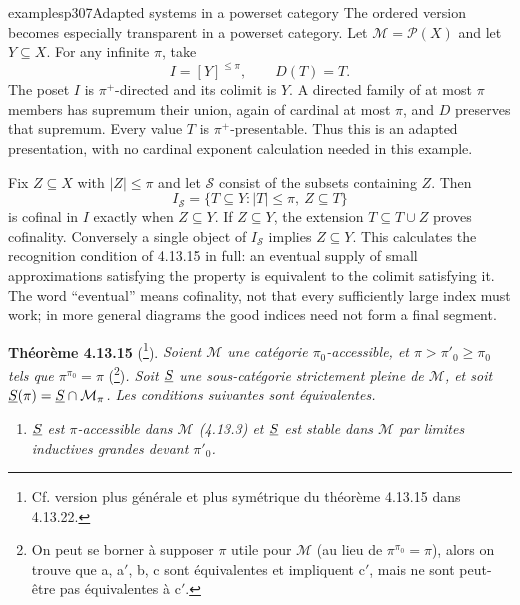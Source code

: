 \begin{dcomment}{examples}{p307}{Adapted systems in a powerset category}
The ordered version becomes especially transparent in a powerset category. Let $\mathcal M=\mathcal P(X)$ and let $Y\subseteq X$. For any infinite $\pi$, take
\[
 I=[Y]^{\leq\pi},\qquad D(T)=T.
\]
The poset $I$ is $\pi^+$-directed and its colimit is $Y$. A directed family of at most $\pi$ members has supremum their union, again of cardinal at most $\pi$, and $D$ preserves that supremum. Every value $T$ is $\pi^+$-presentable. Thus this is an adapted presentation, with no cardinal exponent calculation needed in this example.

Fix $Z\subseteq X$ with $|Z|\leq\pi$ and let $\mathcal S$ consist of the subsets containing $Z$. Then
\[
 I_{\mathcal S}=\{T\subseteq Y:|T|\leq\pi,\ Z\subseteq T\}
\]
is cofinal in $I$ exactly when $Z\subseteq Y$. If $Z\subseteq Y$, the extension $T\subseteq T\cup Z$ proves cofinality. Conversely a single object of $I_{\mathcal S}$ implies $Z\subseteq Y$. This calculates the recognition condition of 4.13.15 in full: an eventual supply of small approximations satisfying the property is equivalent to the colimit satisfying it. The word ``eventual'' means cofinality, not that every sufficiently large index must work; in more general diagrams the good indices need not form a final segment.
\end{dcomment}


\noindent\textbf{Théorème 4.13.15} (\footnote[134]{Cf. version plus générale et plus symétrique du théorème 4.13.15 dans 4.13.22.}). \textit{Soient $\mathcal{M}$ une catégorie $\pi_0$-accessible, et $\pi > \pi'_0 \geqslant \pi_0$ tels que $\pi^{\pi_0} = \pi$} (\footnote[135]{On peut se borner à supposer $\pi$ utile pour $\mathcal{M}$ (au lieu de $\pi^{\pi_0} = \pi$), alors on trouve que a, a$'$, b, c sont équivalentes et impliquent c$'$, mais ne sont peut-être pas équivalentes à c$'$.})\textit{. Soit $\underline{S}$ une sous-catégorie strictement pleine de $\mathcal{M}$, et soit $\underline{S}(\pi) = \underline{S} \cap \mathcal{M}_\pi$. Les conditions suivantes sont équivalentes.}
\begin{enumerate}
\item[\circlabel{a}] \textit{$\underline{S}$ est $\pi$-accessible dans $\mathcal{M}$ (4.13.3) et $\underline{S}$ est stable dans $\mathcal{M}$ par limites inductives grandes devant $\pi'_0$.}
\end{enumerate}


